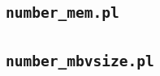 \subsection{\texttt{number\_mem.pl}}
\label{sec:number_mem.pl}



\subsection{\texttt{number\_mbvsize.pl}}
\label{sec:number_mbvsize.pl}





